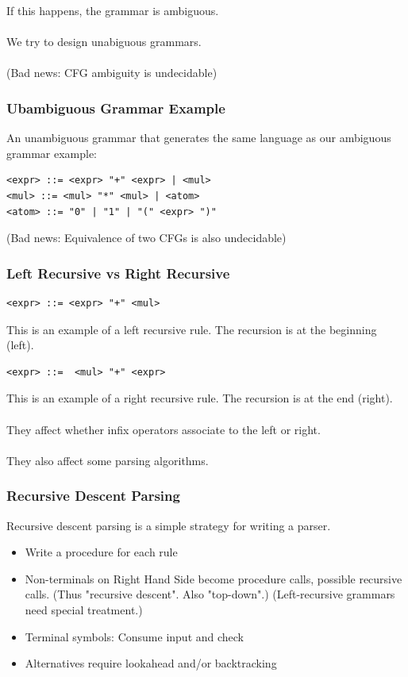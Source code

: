 \documentclass[12pt]{article}
\begin{document}
If this happens, the grammar is ambiguous.\\
\\
We try to design unabiguous grammars.\\
\\
(Bad news: CFG ambiguity is undecidable)

\subsubsection{Ubambiguous Grammar Example}

An unambiguous grammar that generates the same language as our ambiguous grammar example:

\begin{lstlisting}
<expr> ::= <expr> "+" <expr> | <mul>
<mul> ::= <mul> "*" <mul> | <atom>
<atom> ::= "0" | "1" | "(" <expr> ")"
\end{lstlisting}

(Bad news: Equivalence of two CFGs is also undecidable)

\subsubsection{Left Recursive vs Right Recursive}

\begin{lstlisting}
<expr> ::= <expr> "+" <mul>
\end{lstlisting}
This is an example of a left recursive rule. The recursion is at the beginning (left).

\begin{lstlisting}
<expr> ::=  <mul> "+" <expr>
\end{lstlisting}
This is an example of a right recursive rule. The recursion is at the end (right).\\
\\
They affect whether infix operators associate to the left or right.\\
\\
They also affect some parsing algorithms.

\subsubsection{Recursive Descent Parsing}

Recursive descent parsing is a simple strategy for writing a parser.

\begin{itemize}
	\item{Write a procedure for each rule}
	\item{Non-terminals on Right Hand Side become procedure calls, possible recursive calls. (Thus "recursive descent". Also "top-down".) (Left-recursive grammars need special treatment.)}
	\item{Terminal symbols: Consume input and check}
	\item{Alternatives require lookahead and\slash or backtracking}
\end{itemize}
\end{document}
